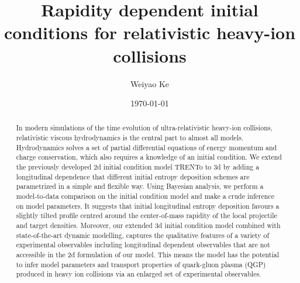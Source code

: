 \documentclass[aps,prl,twocolumn,groupedaddress]{revtex4-1}
\begin{document}

\title{Rapidity dependent initial conditions for relativistic heavy-ion collisions}


\author{Weiyao Ke}


\date{\today}

\begin{abstract}
In modern simulations of the time evolution of ultra-relativistic heavy-ion collisions, relativistic viscous hydrodynamics is the central part to almost all models. Hydrodynamics solves a set of partial differential equations of energy momentum and charge conservation, which also requires a knowledge of an initial condition. We extend the previously developed 2d initial condition model TRENTo to 3d by adding a longitudinal dependence that different initial entropy deposition schemes are parametrized in a simple and flexible way. Using Bayesian analysis, we perform a model-to-data comparison on the initial condition model and make a crude inference on model parameters. It suggests that initial longitudinal entropy deposition favours a slightly tilted profile centred around the center-of-mass rapidity of the local projectile and target densities. Moreover, our extended 3d initial condition model combined with state-of-the-art dynamic modelling, captures the qualitative features of a variety of experimental observables including longitudinal dependent observables that are not accessible in the 2d formulation of our model. This means the model has the potential to infer model parameters and transport properties of quark-gluon plasma (QGP) produced in heavy ion collisions via an enlarged set of experimental observables.
\end{abstract}
\end{document}

